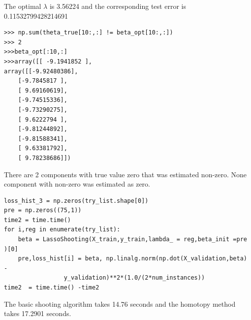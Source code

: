 \documentclass{article}
\newenvironment{sub}[2][$-$]{\begin{trivlist}
		\item[\hskip \labelsep {\bfseries #1}\hskip \labelsep {\bfseries #2.}]}  {\end{trivlist}}
\begin{document}
The optimal $\lambda$ is 3.56224 and the corresponding test error is 0.11532799428214691
\\

\begin{sub}{2.1.2}
\end{sub}

\begin{verbatim}
>>> np.sum(theta_true[10:,:] != beta_opt[10:,:])
>>> 2
>>>beta_opt[:10,:]
>>>array([[ -9.1941852 ],
array([[-9.92480386],
	[-9.7845817 ],
	[ 9.69160619],
	[-9.74515336],
	[-9.73290275],
	[ 9.6222794 ],
	[-9.81244892],
	[-9.81588341],
	[ 9.63381792],
	[ 9.78238686]])

\end{verbatim}

There are 2 components with true value zero that was estimated non-zero. None component with non-zero was estimated as zero.\\

\begin{sub}{2.1.3}
\end{sub}
\begin{verbatim}
loss_hist_3 = np.zeros(try_list.shape[0])
pre = np.zeros((75,1))
time2 = time.time()
for i,reg in enumerate(try_list):
	beta = LassoShooting(X_train,y_train,lambda_ = reg,beta_init =pre )[0]
	pre,loss_hist[i] = beta, np.linalg.norm(np.dot(X_validation,beta) -
				 y_validation)**2*(1.0/(2*num_instances))
time2  = time.time() -time2
\end{verbatim}

The basic shooting algorithm takes 14.76 seconds and the homotopy method takes 17.2901 seconds.

\begin{sub}{2.1.4}
\end{sub}
\end{document}
